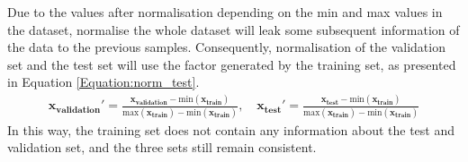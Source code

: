 Due to the values after normalisation depending on the min and max values in the dataset, normalise the whole dataset will leak some subsequent information of the data to the previous samples. 
Consequently, normalisation of the validation set and the test set will use the factor generated by the training set, as presented in Equation \ref{Equation:norm_test}.
\begin{gather}
    \mathbf{x_{validation}}' = \frac{\mathbf{x_{validation}}-\mathrm{min}(\mathbf{x_{train}})}{\mathrm{max}(\mathbf{x_{train}})-\mathrm{min}(\mathbf{x_{train}})}, \quad
    \mathbf{x_{test}}' = \frac{\mathbf{x_{test}}-\mathrm{min}(\mathbf{x_{train}})}{\mathrm{max}(\mathbf{x_{train}})-\mathrm{min}(\mathbf{x_{train}})}
    \label{Equation:norm_test}
\end{gather}
In this way, the training set does not contain any information about the test and validation set, and the three sets still remain consistent.
